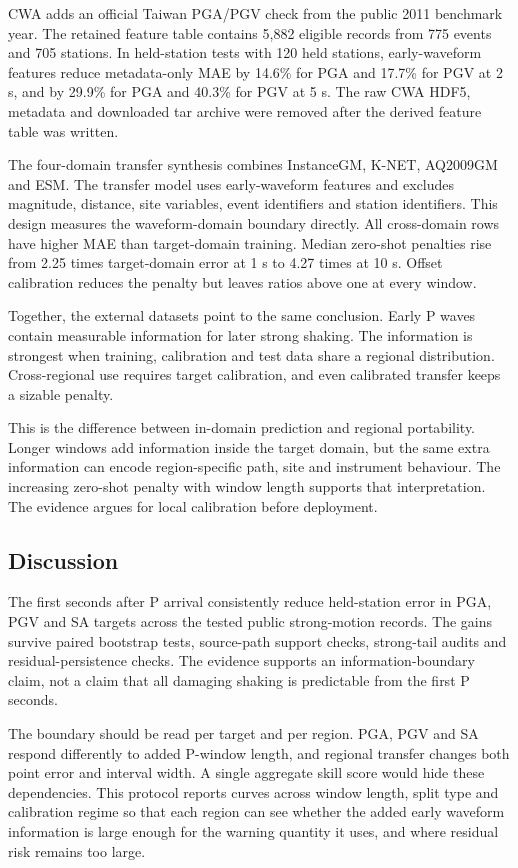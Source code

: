 \documentclass[
  10pt,
]{article}
\begin{document}
CWA adds an official Taiwan PGA/PGV check from the public 2011 benchmark
year. The retained feature table contains 5,882 eligible records from
775 events and 705 stations. In held-station tests with 120 held
stations, early-waveform features reduce metadata-only MAE by 14.6\% for
PGA and 17.7\% for PGV at 2 s, and by 29.9\% for PGA and 40.3\% for PGV
at 5 s. The raw CWA HDF5, metadata and downloaded tar archive were
removed after the derived feature table was written.

The four-domain transfer synthesis combines InstanceGM, K-NET, AQ2009GM
and ESM. The transfer model uses early-waveform features and excludes
magnitude, distance, site variables, event identifiers and station
identifiers. This design measures the waveform-domain boundary directly.
All cross-domain rows have higher MAE than target-domain training.
Median zero-shot penalties rise from 2.25 times target-domain error at 1
s to 4.27 times at 10 s. Offset calibration reduces the penalty but
leaves ratios above one at every window.

Together, the external datasets point to the same conclusion. Early P
waves contain measurable information for later strong shaking. The
information is strongest when training, calibration and test data share
a regional distribution. Cross-regional use requires target calibration,
and even calibrated transfer keeps a sizable penalty.

This is the difference between in-domain prediction and regional
portability. Longer windows add information inside the target domain,
but the same extra information can encode region-specific path, site and
instrument behaviour. The increasing zero-shot penalty with window
length supports that interpretation. The evidence argues for local
calibration before deployment.

\subsection{Discussion}\label{discussion}

The first seconds after P arrival consistently reduce held-station error
in PGA, PGV and SA targets across the tested public strong-motion
records. The gains survive paired bootstrap tests, source-path support
checks, strong-tail audits and residual-persistence checks. The evidence
supports an information-boundary claim, not a claim that all damaging
shaking is predictable from the first P seconds.

The boundary should be read per target and per region. PGA, PGV and SA
respond differently to added P-window length, and regional transfer
changes both point error and interval width. A single aggregate skill
score would hide these dependencies. This protocol reports curves across
window length, split type and calibration regime so that each region can
see whether the added early waveform information is large enough for the
warning quantity it uses, and where residual risk remains too large.
\end{document}
